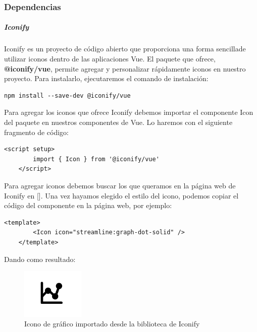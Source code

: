 \subsubsection{Dependencias}
\subparagraph{Iconify}

Iconify es un proyecto de código abierto que proporciona una forma sencillade utilizar iconos dentro de las aplicaciones Vue. El paquete que ofrece, \textbf{@iconify/vue}, permite agregar y personalizar rápidamente iconos en nuestro proyecto. Para instalarlo, ejecutaremos el comando de instalación:

\begin{lstlisting}[style=Consola, caption={Instalación del paquete iconify},label=Consola_code]
	npm install --save-dev @iconify/vue
\end{lstlisting}

Para agregar los iconos que ofrece Iconify debemos importar el componente Icon del paquete en nuestros componentes de Vue. Lo haremos con el siguiente fragmento de código:

\begin{lstlisting}[style=PHP-color, caption={Importar el componente Icon en Vue},label=PHP-color_code]
	<script setup>
		import { Icon } from '@iconify/vue'
	</script>
\end{lstlisting}

Para agregar iconos debemos buscar los que queramos en la página web de Iconify en [\citep{iconos-iconify}]. Una vez hayamos elegido el estilo del icono, podemos copiar el código del componente en la página web, por ejemplo:

\begin{lstlisting}[style=PHP-color, caption={Código para agregar un icono a la página},label=PHP-color_code]
	<template>
		<Icon icon="streamline:graph-dot-solid" />
	</template>
\end{lstlisting}

Dando como resultado:
\begin{figure}[H]
    \centering
    \includegraphics[width=3cm]{archivos/tfg_jorge/icoco_grafico_iconify}
    \caption{Icono de gráfico importado desde la biblioteca de Iconify}\label{sistemass2}
\end{figure}

